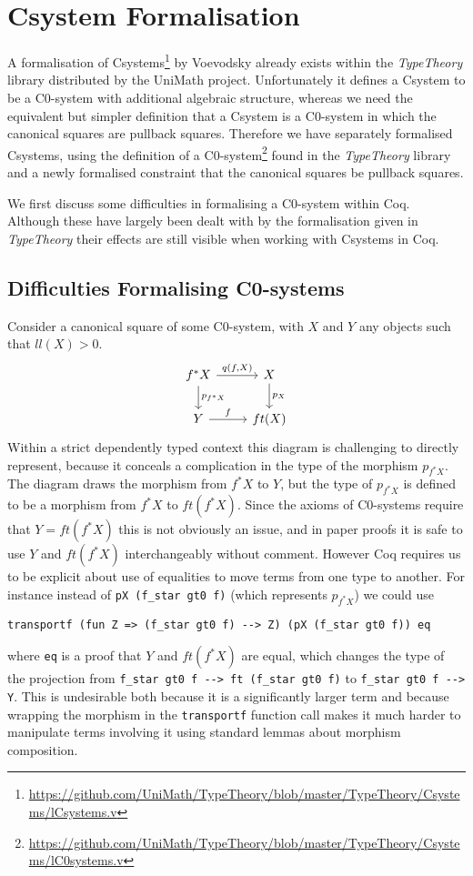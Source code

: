 \chapter{Csystem Formalisation}
A formalisation of
Csystems\footnote{\url{https://github.com/UniMath/TypeTheory/blob/master/TypeTheory/Csystems/lCsystems.v}}
by Voevodsky already exists within the \textit{TypeTheory} library distributed
by the UniMath project. Unfortunately it defines a Csystem to be a C0-system
with additional algebraic structure, whereas we need the equivalent but simpler
definition that a Csystem is a C0-system in which the canonical squares are
pullback squares. Therefore we have separately formalised Csystems, using the
definition of a
C0-system\footnote{\url{https://github.com/UniMath/TypeTheory/blob/master/TypeTheory/Csystems/lC0systems.v}}
found in the \textit{TypeTheory} library and a newly formalised constraint that
the canonical squares be pullback squares.

We first discuss some difficulties in formalising a C0-system within Coq.
Although these have largely been dealt with by the formalisation given in
\textit{TypeTheory} their effects are still visible when working with Csystems
in Coq.

\section{Difficulties Formalising C0-systems}
Consider a canonical square of some C0-system, with $X$ and $Y$ any objects such
that $ll(X) > 0$.
\[
\begin{tikzcd}
    f^*X\ar[r,"{q(f,X)}"]\ar[d,"p_{f^*X}"]&X\ar[d,"p_X"] \\
    Y\ar[r,"f"]&ft(X)
\end{tikzcd}
\]
Within a strict dependently typed context this diagram is challenging to
directly represent, because it conceals a complication in the type of the
morphism $p_{f^*X}$. The diagram draws the morphism from $f^*X$ to $Y$, but the
type of $p_{f^*X}$ is defined to be a morphism from $f^*X$ to $ft(f^*X)$. Since
the axioms of C0-systems require that $Y=ft(f^*X)$ this is not obviously an
issue, and in paper proofs it is safe to use $Y$ and $ft(f^*X)$ interchangeably
without comment. However Coq requires us to be explicit about use of equalities
to move terms from one type to another. For instance instead of 
\lstinline|pX (f_star gt0 f)| (which represents $p_{f^*X}$) we could use
\begin{lstlisting}
transportf (fun Z => (f_star gt0 f) --> Z) (pX (f_star gt0 f)) eq
\end{lstlisting}
where \lstinline|eq| is a proof that $Y$ and $ft(f^*X)$ are equal, which changes
the type of the projection from \lstinline|f_star gt0 f --> ft (f_star gt0 f)|
to \lstinline|f_star gt0 f --> Y|. This is undesirable both because it is a
significantly larger term and because wrapping the morphism in the
\lstinline|transportf| function call makes it much harder to manipulate terms
involving it using standard lemmas about morphism composition.

